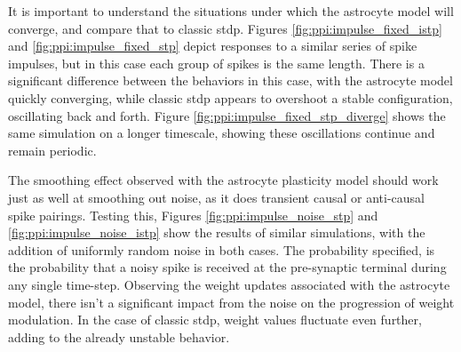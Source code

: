 

It is important to understand the situations under which the astrocyte model
will converge, and compare that to classic \gls{stdp}. Figures
\ref{fig:ppi:impulse_fixed_istp} and \ref{fig:ppi:impulse_fixed_stp} depict
responses to a similar series of spike impulses, but in this case each group of
spikes is the same length. There is a significant difference between the
behaviors in this case, with the astrocyte model quickly converging, while
classic \gls{stdp} appears to overshoot a stable configuration, oscillating back and
forth. Figure \ref{fig:ppi:impulse_fixed_stp_diverge} shows the same simulation
on a longer timescale, showing these oscillations continue and remain periodic.




The smoothing effect observed with the astrocyte plasticity model should work
just as well at smoothing out noise, as it does transient causal or anti-causal
spike pairings. Testing this, Figures \ref{fig:ppi:impulse_noise_stp} and
\ref{fig:ppi:impulse_noise_istp} show the results of similar simulations, with
the addition of uniformly random noise in both cases. The probability specified,
is the probability that a noisy spike is received at the pre-synaptic
terminal during any single time-step. Observing the weight updates associated
with the astrocyte model, there isn't a significant impact from the noise on the
progression of weight modulation. In the case of classic \gls{stdp}, weight values
fluctuate even further, adding to the already unstable behavior.

